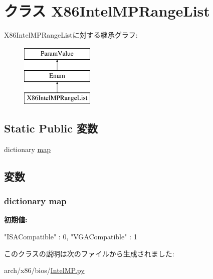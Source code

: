 \hypertarget{classIntelMP_1_1X86IntelMPRangeList}{
\section{クラス X86IntelMPRangeList}
\label{classIntelMP_1_1X86IntelMPRangeList}
}
X86IntelMPRangeListに対する継承グラフ:\begin{figure}[H]
\begin{center}
\leavevmode
\includegraphics[height=3cm]{classIntelMP_1_1X86IntelMPRangeList}
\end{center}
\end{figure}
\subsection*{Static Public 変数}
\begin{DoxyCompactItemize}
\item 
dictionary \hyperlink{classIntelMP_1_1X86IntelMPRangeList_aca70ca58dda85cf4fe7a0737ec18e004}{map}
\end{DoxyCompactItemize}


\subsection{変数}
\hypertarget{classIntelMP_1_1X86IntelMPRangeList_aca70ca58dda85cf4fe7a0737ec18e004}{
\subsubsection[{map}]{\setlength{\rightskip}{0pt plus 5cm}dictionary {\bf map}}}
\label{classIntelMP_1_1X86IntelMPRangeList_aca70ca58dda85cf4fe7a0737ec18e004}
{\bfseries 初期値:}
\begin{DoxyCode}
{"ISACompatible" : 0,
           "VGACompatible" : 1
    }
\end{DoxyCode}


このクラスの説明は次のファイルから生成されました:\begin{DoxyCompactItemize}
\item 
arch/x86/bios/\hyperlink{IntelMP_8py}{IntelMP.py}\end{DoxyCompactItemize}
